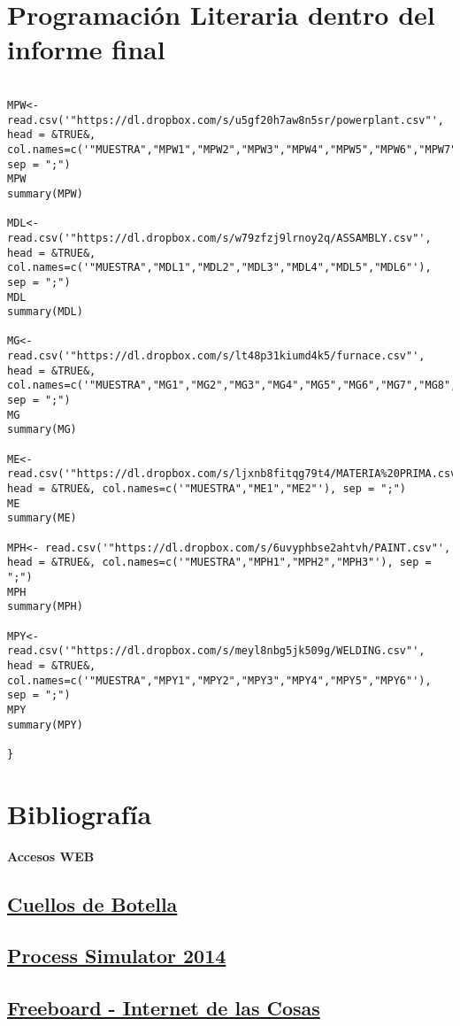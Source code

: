\documentclass[10pt]{article}   			%
\begin{document}
\newpage
\section{Programación Literaria dentro del informe final}

\begin{small}
\begin{lstlisting}[frame=single,style=base]	

MPW<- read.csv('"https://dl.dropbox.com/s/u5gf20h7aw8n5sr/powerplant.csv"', head = &TRUE&, col.names=c('"MUESTRA","MPW1","MPW2","MPW3","MPW4","MPW5","MPW6","MPW7","MPW8","MPW9","MPW10","MPW11"'), sep = ";")
MPW
summary(MPW)

MDL<- read.csv('"https://dl.dropbox.com/s/w79zfzj9lrnoy2q/ASSAMBLY.csv"', head = &TRUE&, col.names=c('"MUESTRA","MDL1","MDL2","MDL3","MDL4","MDL5","MDL6"'), sep = ";")
MDL
summary(MDL)

MG<- read.csv('"https://dl.dropbox.com/s/lt48p31kiumd4k5/furnace.csv"', head = &TRUE&, col.names=c('"MUESTRA","MG1","MG2","MG3","MG4","MG5","MG6","MG7","MG8","MG9"'), sep = ";")
MG
summary(MG)

ME<- read.csv('"https://dl.dropbox.com/s/ljxnb8fitqg79t4/MATERIA%20PRIMA.csv"', head = &TRUE&, col.names=c('"MUESTRA","ME1","ME2"'), sep = ";")
ME
summary(ME)

MPH<- read.csv('"https://dl.dropbox.com/s/6uvyphbse2ahtvh/PAINT.csv"', head = &TRUE&, col.names=c('"MUESTRA","MPH1","MPH2","MPH3"'), sep = ";")
MPH
summary(MPH)

MPY<- read.csv('"https://dl.dropbox.com/s/meyl8nbg5jk509g/WELDING.csv"', head = &TRUE&, col.names=c('"MUESTRA","MPY1","MPY2","MPY3","MPY4","MPY5","MPY6"'), sep = ";")
MPY
summary(MPY)

}
\end{lstlisting}
\end{small}
		
\section{Bibliografía}	
\textbf{{\Large Accesos WEB}}
	\subsection{ \href{http://cuellodebotella.com/}{Cuellos de Botella}} 
	\subsection{ \href{https://www.promodel.com/Products/ProcessSimulator}{Process Simulator 2014}} 
	\subsection{ \href{https://freeboard.io/}{Freeboard - Internet de las Cosas}} 

\nocite{*}
\end{document}
